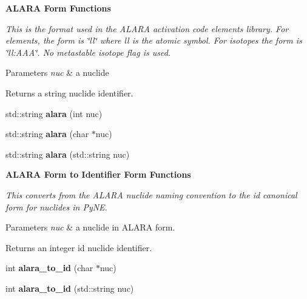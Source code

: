 \begin{Indent}{\bf A\-L\-A\-R\-A Form Functions}\par
{\em This is the format used in the A\-L\-A\-R\-A activation code elements library. For elements, the form is \char`\"{}ll\char`\"{} where ll is the atomic symbol. For isotopes the form is \char`\"{}ll\-:\-A\-A\-A\char`\"{}. No metastable isotope flag is used. 
\begin{DoxyParams}{Parameters}
{\em nuc} & a nuclide \\
\hline
\end{DoxyParams}
\begin{DoxyReturn}{Returns}
a string nuclide identifier. 
\end{DoxyReturn}
}\begin{DoxyCompactItemize}
\item 
\hypertarget{namespacepyne_1_1nucname_a6180f363d79c5865e19299a12bf6bc7f}{std\-::string {\bfseries alara} (int nuc)}\label{namespacepyne_1_1nucname_a6180f363d79c5865e19299a12bf6bc7f}

\item 
\hypertarget{namespacepyne_1_1nucname_a5ba5bc4bd02c919e860906376b452c8f}{std\-::string {\bfseries alara} (char $\ast$nuc)}\label{namespacepyne_1_1nucname_a5ba5bc4bd02c919e860906376b452c8f}

\item 
\hypertarget{namespacepyne_1_1nucname_a4317364d7f2fd4271d8d6d64a3844473}{std\-::string {\bfseries alara} (std\-::string nuc)}\label{namespacepyne_1_1nucname_a4317364d7f2fd4271d8d6d64a3844473}

\end{DoxyCompactItemize}
\end{Indent}
\begin{Indent}{\bf A\-L\-A\-R\-A Form to Identifier Form Functions}\par
{\em This converts from the A\-L\-A\-R\-A nuclide naming convention to the id canonical form for nuclides in Py\-N\-E. 
\begin{DoxyParams}{Parameters}
{\em nuc} & a nuclide in A\-L\-A\-R\-A form. \\
\hline
\end{DoxyParams}
\begin{DoxyReturn}{Returns}
an integer id nuclide identifier. 
\end{DoxyReturn}
}\begin{DoxyCompactItemize}
\item 
\hypertarget{namespacepyne_1_1nucname_a51250ed018402943cf7846ed18b6a1eb}{int {\bfseries alara\-\_\-to\-\_\-id} (char $\ast$nuc)}\label{namespacepyne_1_1nucname_a51250ed018402943cf7846ed18b6a1eb}

\item 
\hypertarget{namespacepyne_1_1nucname_aa9cbfbadae0f367edadd700a036d0c8a}{int {\bfseries alara\-\_\-to\-\_\-id} (std\-::string nuc)}\label{namespacepyne_1_1nucname_aa9cbfbadae0f367edadd700a036d0c8a}

\end{DoxyCompactItemize}
\end{Indent}
